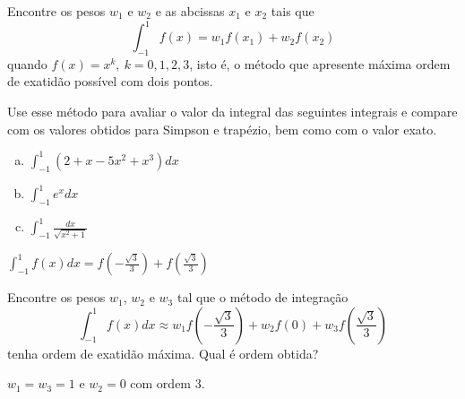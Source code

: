 \begin{exer} Encontre os pesos $w_1$ e $w_2$ e as abcissas $x_1$ e $x_2$ tais que
$$\int_{-1}^1f(x)=w_1f(x_1)+w_2f(x_2)$$
quando $f(x)=x^k, ~k=0,1,2,3$, isto é, o método que apresente máxima ordem de exatidão possível com dois pontos.

Use esse método para avaliar o valor da integral das seguintes integrais e compare com os valores obtidos para Simpson e trapézio, bem como com o valor exato.
\begin{enumerate}[a)]
\item $\displaystyle \int_{-1}^1\left(2+x-5x^2+x^3\right)dx$
\item $\displaystyle \int_{-1}^1e^{x}dx$
\item $\displaystyle \int_{-1}^1\frac{dx}{\sqrt{x^2+1}}$
\end{enumerate}
\end{exer}
\begin{resp}
  $\displaystyle \int_{-1}^1f(x)dx=f\left(-\frac{\sqrt{3}}{3}\right)+f\left(\frac{\sqrt{3}}{3}\right)$
\end{resp}


\begin{exer} Encontre os pesos $w_1$, $w_2$ e $w_3$ tal que o método de integração
$$\int_{-1}^1 f(x)dx \approx w_1 f\left(-\frac{\sqrt{3}}{3}\right)  + w_2f(0) + w_3f\left(\frac{\sqrt{3}}{3}\right)$$
tenha ordem de exatidão máxima. Qual é ordem obtida?
\end{exer}
\begin{resp}
  $w_1=w_3=1$ e $w_2=0$ com ordem 3.
\end{resp}


%

